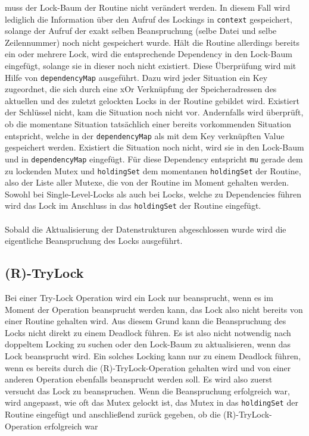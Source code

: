 muss der Lock-Baum der Routine nicht verändert werden. In diesem Fall wird 
lediglich die Information über den Aufruf des Lockings in \texttt{context} gespeichert,
solange der Aufruf der exakt selben Beanspruchung (selbe Datei und selbe Zeilennummer)
noch nicht gespeichert wurde. Hält die Routine allerdings bereits ein oder 
mehrere Lock, wird die entsprechende Dependency in den Lock-Baum eingefügt,
solange sie in dieser noch nicht existiert. Diese Überprüfung wird mit Hilfe 
von \texttt{dependencyMap} ausgeführt. Dazu wird jeder Situation ein 
Key zugeordnet, die sich durch eine xOr Verknüpfung der Speicheradressen
des aktuellen und des zuletzt gelockten Locks in der Routine gebildet wird.
Existiert der Schlüssel nicht, kam die Situation noch nicht vor. Andernfalls 
wird überprüft, ob die momentane Situation tatsächlich einer bereits vorkommenden 
Situation entspricht, welche in der \texttt{dependencyMap} als mit dem Key verknüpften Value 
gespeichert werden.
Existiert die Situation noch nicht, wird sie in den 
Lock-Baum und in \texttt{dependencyMap} eingefügt. Für diese Dependency entspricht \texttt{mu}
gerade dem zu lockenden Mutex und \texttt{holdingSet} dem momentanen \texttt{holdingSet} 
der Routine, also der Liste aller Mutexe, die von der Routine im Moment gehalten 
werden.\\
Sowohl bei Single-Level-Locks als auch bei Locks, welche zu Dependencies führen
wird das Lock im Anschluss in das \texttt{holdingSet} der Routine eingefügt.\\\\
Sobald die Aktualisierung der Datenstrukturen abgeschlossen wurde wird die 
eigentliche Beanspruchung des Locks ausgeführt.

\subsection{(R)-TryLock}
Bei einer Try-Lock Operation wird ein Lock nur beansprucht, wenn es im Moment 
der Operation beansprucht werden kann, das Lock also nicht bereits von einer Routine 
gehalten wird. Aus diesem Grund kann die Beanspruchung des Locks nicht direkt 
zu einem Deadlock führen. Es ist also nicht notwendig nach doppeltem Locking 
zu suchen oder den Lock-Baum zu aktualisieren, wenn das Lock beansprucht wird.
Ein solches Locking kann nur zu einem Deadlock führen, wenn es bereits durch 
die (R)-TryLock-Operation gehalten wird und von einer anderen Operation ebenfalls 
beansprucht werden soll. Es wird also zuerst versucht das Lock zu beanspruchen.
Wenn die Beanspruchung erfolgreich war, wird angepasst, wie oft das Mutex gelockt ist,
das Mutex in das \texttt{holdingSet} der Routine eingefügt und anschließend zurück gegeben, ob die (R)-TryLock-Operation erfolgreich war
